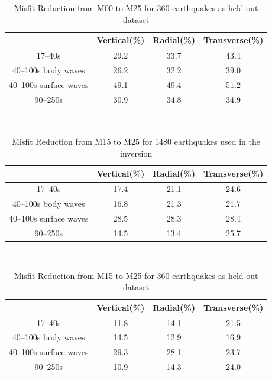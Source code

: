 \documentclass[extra,mreferee]{gji}
\begin{document}
\begin{table}[!htb]
  \centering
  \begin{tabular}{|c|c|c|c|}
    \hline
    ~          &  Vertical(\%) & Radial(\%) &  Transverse(\%) \\
    \hline
    17--40s                &         29.2 &       33.7 &       43.4 \\
    40--100s body waves    &         26.2 &       32.2 &       39.0 \\
    40--100s surface waves &         49.1 &       49.4 &       51.2 \\
    90--250s               &         30.9 &       34.8 &       34.9 \\
    \hline
  \end{tabular}\\
  \caption{Misfit Reduction from M00 to M25 for 360 earthquakes as held-out dataset}
  \label{table:misfit_reduction_M00_M25_360}
\end{table}

\begin{table}[!htb]
  \centering
  \begin{tabular}{|c|c|c|c|}
    \hline
    ~          &  Vertical(\%) & Radial(\%) &  Transverse(\%) \\
    \hline
    17--40s                &   17.4   &       21.1 &       24.6 \\
    40--100s body waves    &   16.8   &       21.3 &       21.7 \\
    40--100s surface waves &   28.5   &       28.3 &       28.4 \\
    90--250s               &   14.5   &       13.4 &       25.7 \\
    \hline
  \end{tabular}\\
  \label{table:misfit_reduction_M15_M25}
  \caption{Misfit Reduction from M15 to M25 for 1480 earthquakes used in the inversion}
\end{table}

\begin{table}[!htb]
  \centering
  \begin{tabular}{|c|c|c|c|}
  \hline
  ~          &  Vertical(\%) & Radial(\%) &  Transverse(\%) \\
  \hline
  17--40s                &          11.8 &       14.1 &       21.5 \\
  40--100s body waves    &          14.5 &       12.9 &       16.9 \\
  40--100s surface waves &          29.3 &       28.1 &       23.7 \\
  90--250s               &          10.9 &       14.3 &       24.0 \\
  \hline
  \end{tabular}\\
  \caption{Misfit Reduction from M15 to M25 for 360 earthquakes as held-out dataset}
  \label{table:misfit_reduction_M15_M25_360}
\end{table}
\end{document}
